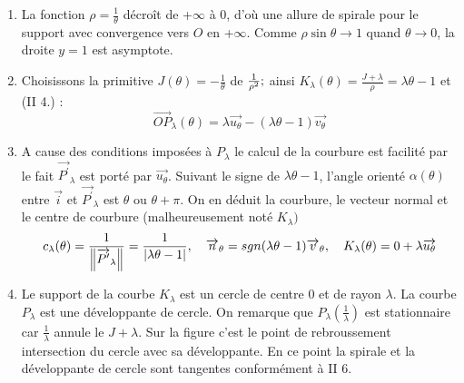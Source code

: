 \begin{enumerate}
\item  La fonction $\rho =\frac{1}{\theta }$ d\'{e}cro\^{i}t de +$\infty $
\`{a} 0, d'o\`{u} une allure de spirale pour le support avec convergence
vers $O$ en +$\infty $. Comme $\rho \sin \theta \rightarrow 1$ quand $\theta
\rightarrow 0$, la droite $y=1$ est asymptote.

\item  Choisissons la primitive $J(\theta )=-\frac{1}{\theta }$ de $\frac{1}{%
\rho ^{2}};$ ainsi $K_{\lambda }(\theta )=\frac{J+\lambda }{\rho }=\lambda
\theta -1$ et (II 4.) :
\[
\overrightarrow{OP}_{\lambda }(\theta )=\lambda \overrightarrow{u_{\theta }}%
-(\lambda \theta -1)\overrightarrow{v_{\theta }}
\]

\item  A cause des conditions impos\'{e}es \`{a} $P_{\lambda }$ le calcul de
la courbure est facilit\'{e} par le fait $\overrightarrow{P^{\prime }}%
_{\lambda }$ est port\'{e} par $\overrightarrow{u_{\theta }}$. Suivant le
signe de $\lambda \theta -1$, l'angle orient\'{e} $\alpha (\theta )$ entre $%
\overrightarrow{i}$ et $\overrightarrow{P^{\prime }}_{\lambda }$ est $\theta
$ ou $\theta +\pi $. On en d\'{e}duit la courbure, le vecteur normal et le
centre de courbure (malheureusement not\'{e} $K_{\lambda })$%
\[
c_{\lambda }(\theta )=\frac{1}{\left\| \overrightarrow{P^{\prime }}_{\lambda
}\right\| }=\frac{1}{\left| \lambda \theta -1\right| },\quad \overrightarrow{%
n}_{\theta }=sgn(\lambda \theta -1)\overrightarrow{v}_{\theta },\quad
K_{\lambda }(\theta )=0+\lambda \overrightarrow{u_{\theta }}
\]

\item  Le support de la courbe $K_{\lambda }$ est un cercle de centre $0$ et
de rayon $\lambda $. La courbe $P_{\lambda }$ est une d\'{e}veloppante de
cercle. On remarque que $P_{\lambda }(\frac{1}{\lambda })$ est stationnaire
car $\frac{1}{\lambda }$ annule le $J+\lambda $. Sur la figure c'est le
point de rebroussement intersection du cercle avec sa d\'{e}veloppante. En
ce point la spirale et la d\'{e}veloppante de cercle sont tangentes
conform\'{e}ment \`{a} II 6.
\end{enumerate}
